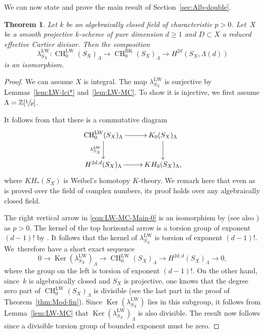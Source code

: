 \documentclass[11pt]{article}
\numberwithin{equation}{section}
\newcommand{\BK}{\mathrm{BK}}
\newcommand{\LW}{\mathrm{LW}}
\newtheorem{thm}{Theorem}[section]
\theoremstyle{definition}
\newcommand{\thmref}{Theorem~\ref}
\newcommand{\lemref}{Lemma~\ref}
\newcommand{\secref}{Section~\ref}
\newcommand{\Z}{{\mathbb Z}}
\DeclareMathOperator{\CH}{CH}
\DeclareMathOperator{\Ker}{Ker}
\begin{document}
We can now state and prove the main result of \secref{sec:Alb-double}.

\begin{thm}\label{thm:LW-MC-Main}
Let $k$ be an algebraically closed field of characteristic $p > 0$.
Let~$X$ be a smooth projective $k$-scheme
of pure dimension $d\geq 1$ and $D \subset X$ a reduced effective Cartier
divisor. Then the composition
\[
\lambda^{\LW}_{S_X} \colon \CH^{\LW}_0(S_X)_\Lambda \to \CH^{\BK}_0(S_X)_\Lambda \to
H^{2d}(S_X, \Lambda(d))
\]
is an isomorphism.
\end{thm}
\begin{proof}
We can assume $X$ is integral.
The map $\lambda^{\LW}_{S_X}$ is surjective by Lemmas~\ref{lem:LW-lci*} and~\ref{lem:LW-MC}. To show it is injective, we first assume
$\Lambda = \Z[\sfrac{1}{p}]$.

It follows from \cite[Th.\,5.9, Lem.\,8.1]{KP} that there
is a commutative diagram\vspace*{-3pt}\enlargethispage{\baselineskip}%
\begin{equation}\label{eqn:LW-MC-Main-0}
\begin{array}{c}
\xymatrix{
\CH^{\LW}_0(S_X)_\Lambda \ar[r] \ar[d]_-{\lambda_{S_X}^{\LW}} &
K_0(S_X)_\Lambda \ar[d] \\
H^{2d,d}(S_X)_\Lambda \ar[r] & KH_0(S_X)_\Lambda,}
\end{array}
\end{equation}
where $KH_*(S_X)$ is Weibel's homotopy $K$-theory.
We remark here that even as \hbox{\cite[Lem.\,8.1]{KP}} is proved over the field
of complex numbers, its proof holds over any algebraically closed field.

The right vertical arrow in \eqref{eqn:LW-MC-Main-0}
is an isomorphism by \cite{WeibelKH} (see also \cite[Exer.\,9.11]{TT}) as $p > 0$.
The kernel of the top horizontal arrow is a torsion group of
exponent $(d-1)!$ by \cite[Cor.\,2.7]{Levine-2}. It follows that the
kernel of $\lambda^{\LW}_{S_X}$ is torsion of exponent $(d-1)!$.
We~therefore have a short exact sequence\vspace*{-3pt}
\begin{equation}\label{eqn:LW-MC-Main-1}
0 \to \Ker(\lambda^{\LW}_{S_X})_\Lambda \to
\CH^{\LW}_0(S_X)_\Lambda \to H^{2d,d}(S_X)_\Lambda \to 0,
\end{equation}
where the group on the left is torsion of exponent $(d-1)!$.
On the other hand, since~$k$ is algebraically closed and $S_X$ is projective,
one knows that the degree zero part
of $\CH^{\LW}_0(S_X)_\Lambda$ is divisible (see the last part in the proof of
\thmref{thm:Mod-fin}).
Since $\Ker(\lambda^{\LW}_{S_X})$ lies in this subgroup,
it follows from \lemref{lem:LW-MC} that
$\Ker(\lambda^{\LW}_{S_X})_\Lambda$ is also divisible.
The result now follows since a divisible torsion group of bounded exponent
must be zero.


\end{proof}
\end{document}
